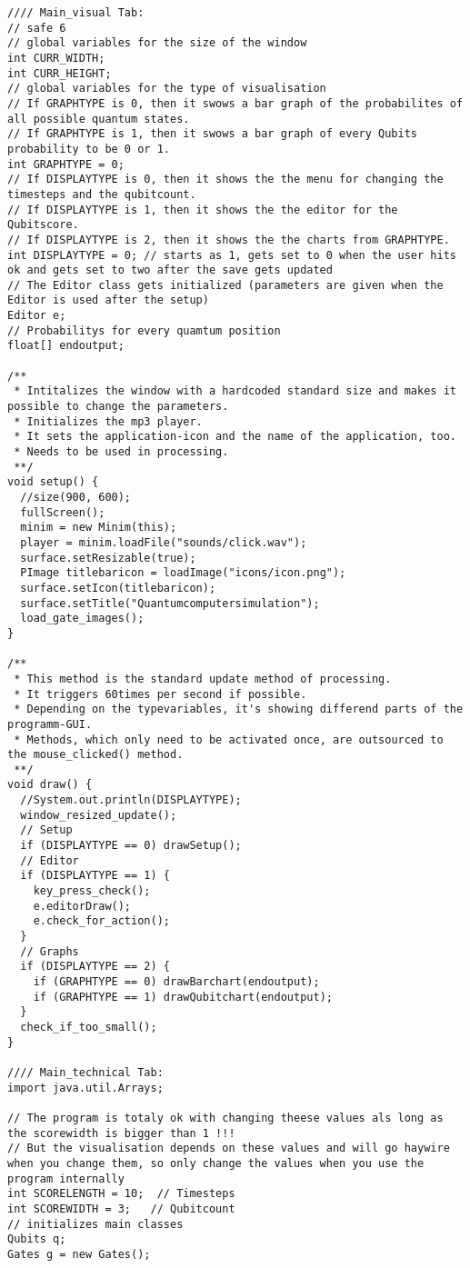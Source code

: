 \documentclass[12pt]{report}
\begin{document}
\lstset{escapechar=@,style=customcsmall}
\begin{lstlisting}
//// Main_visual Tab:
// safe 6
// global variables for the size of the window
int CURR_WIDTH;
int CURR_HEIGHT;
// global variables for the type of visualisation
// If GRAPHTYPE is 0, then it swows a bar graph of the probabilites of all possible quantum states.
// If GRAPHTYPE is 1, then it swows a bar graph of every Qubits probability to be 0 or 1.
int GRAPHTYPE = 0;
// If DISPLAYTYPE is 0, then it shows the the menu for changing the timesteps and the qubitcount.
// If DISPLAYTYPE is 1, then it shows the the editor for the Qubitscore.
// If DISPLAYTYPE is 2, then it shows the the charts from GRAPHTYPE.
int DISPLAYTYPE = 0; // starts as 1, gets set to 0 when the user hits ok and gets set to two after the save gets updated
// The Editor class gets initialized (parameters are given when the Editor is used after the setup)
Editor e;
// Probabilitys for every quamtum position
float[] endoutput;

/**
 * Intitalizes the window with a hardcoded standard size and makes it possible to change the parameters.
 * Initializes the mp3 player.
 * It sets the application-icon and the name of the application, too.
 * Needs to be used in processing.
 **/
void setup() {
  //size(900, 600);
  fullScreen();
  minim = new Minim(this);
  player = minim.loadFile("sounds/click.wav");
  surface.setResizable(true);
  PImage titlebaricon = loadImage("icons/icon.png");
  surface.setIcon(titlebaricon);
  surface.setTitle("Quantumcomputersimulation");
  load_gate_images();
}

/**
 * This method is the standard update method of processing.
 * It triggers 60times per second if possible.
 * Depending on the typevariables, it's showing differend parts of the programm-GUI.
 * Methods, which only need to be activated once, are outsourced to the mouse_clicked() method.
 **/
void draw() {
  //System.out.println(DISPLAYTYPE);
  window_resized_update();
  // Setup
  if (DISPLAYTYPE == 0) drawSetup();
  // Editor
  if (DISPLAYTYPE == 1) {
    key_press_check();
    e.editorDraw();
    e.check_for_action();
  }
  // Graphs
  if (DISPLAYTYPE == 2) {
    if (GRAPHTYPE == 0) drawBarchart(endoutput);
    if (GRAPHTYPE == 1) drawQubitchart(endoutput);
  }
  check_if_too_small();
}

//// Main_technical Tab:
import java.util.Arrays;

// The program is totaly ok with changing theese values als long as the scorewidth is bigger than 1 !!!
// But the visualisation depends on these values and will go haywire when you change them, so only change the values when you use the program internally
int SCORELENGTH = 10;  // Timesteps
int SCOREWIDTH = 3;   // Qubitcount
// initializes main classes
Qubits q;
Gates g = new Gates();


\end{lstlisting}
\end{document}
